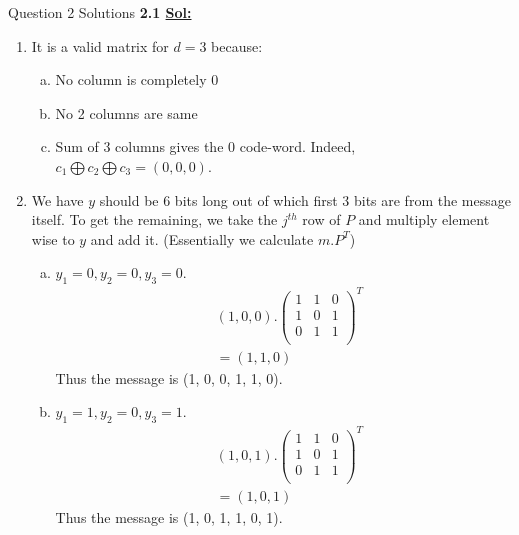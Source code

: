 \documentclass[xcolor=svgnames]{beamer}
\begin{document}
\begin{frame}{Question 2 Solutions}
    \textbf{2.1 \underline{Sol:}}
    \begin{enumerate}
        \item It is a valid matrix for $d = 3$ because: 
        \begin{enumerate}[a.]
            \item No column is completely 0
            \item No 2 columns are same
            \item Sum of 3 columns gives the 0 code-word. Indeed, $c_1 \bigoplus c_2 \bigoplus c_3 = (0,0,0)$.
        \end{enumerate}
        \end{enumerate}
\end{frame}
\begin{frame}
    \begin{enumerate}\setcounter{enumi}{1}
        \item We have $y$ should be 6 bits long out of which first 3 bits are from the message itself. To get the remaining, we take the $j^{th}$ row of $P$ and multiply element wise to $y$ and add it. (Essentially we calculate $m.P^T$)
        \begin{enumerate}[a.]
            \item 
        $y_1 = 0, y_2 = 0, y_3 = 0$.
        \begin{align*}
             &(1, 0, 0) .\begin{pmatrix} 
            1 & 1 & 0  \\
            1 & 0 & 1  \\
            0 & 1 & 1  \\
            \end{pmatrix}^T
            \\ &= (1,1,0)
        \end{align*}
            Thus the message is (1, 0, 0, 1, 1, 0).
        \item 
        $y_1 = 1, y_2 = 0, y_3 = 1$.
        \begin{align*}
             &(1, 0, 1) .\begin{pmatrix} 
            1 & 1 & 0  \\
            1 & 0 & 1  \\
            0 & 1 & 1  \\
            \end{pmatrix}^T
            \\ &= (1,0,1)
        \end{align*}
            Thus the message is (1, 0, 1, 1, 0, 1).
        
        \end{enumerate}
    
    \end{enumerate}
\end{frame}
\end{document}
